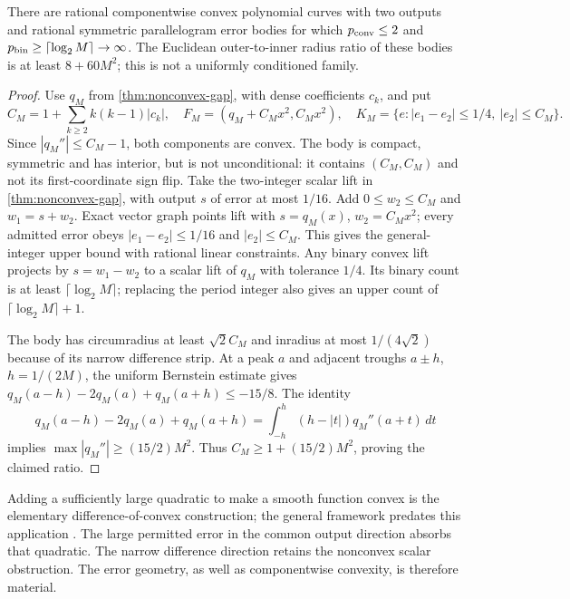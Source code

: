 \begin{proposition}\label{prop:tilted-gap}
There are rational componentwise convex polynomial curves with two outputs
and rational symmetric parallelogram error bodies for which
$p_{\mathrm{conv}}\le2$ and $p_{\mathrm{bin}}\ge\lceil\log_2M\rceil\to\infty$.
The Euclidean outer-to-inner radius ratio of these bodies is at least
$8+60M^2$; this is not a uniformly conditioned family.
\end{proposition}
\begin{proof}
Use $q_M$ from \cref{thm:nonconvex-gap}, with dense coefficients $c_k$,
and put
\[
 C_M=1+\sum_{k\ge2}k(k-1)|c_k|,\quad
 F_M=(q_M+C_Mx^2,C_Mx^2),\quad
 K_M=\{e:|e_1-e_2|\le1/4,\ |e_2|\le C_M\}.
\]
Since $|q_M''|\le C_M-1$, both components are convex. The body is
compact, symmetric and has interior, but is not unconditional: it
contains $(C_M,C_M)$ and not its first-coordinate sign flip.
Take the two-integer scalar lift in \cref{thm:nonconvex-gap}, with
output $s$ of error at most $1/16$. Add $0\le w_2\le C_M$ and
$w_1=s+w_2$. Exact vector graph points lift with
$s=q_M(x)$, $w_2=C_Mx^2$; every admitted error obeys
$|e_1-e_2|\le1/16$ and $|e_2|\le C_M$. This gives the general-integer
upper bound with rational linear constraints.
Any binary convex lift projects by $s=w_1-w_2$ to a scalar lift of
$q_M$ with tolerance $1/4$. Its binary count is at least
$\lceil\log_2M\rceil$; replacing the period integer also gives an
upper count of $\lceil\log_2M\rceil+1$.

The body has circumradius at least $\sqrt2C_M$ and inradius at most
$1/(4\sqrt2)$ because of its narrow difference strip. At a peak $a$
and adjacent troughs $a\pm h$, $h=1/(2M)$, the uniform Bernstein
estimate gives
$q_M(a-h)-2q_M(a)+q_M(a+h)\le-15/8$.
The identity
\[
 q_M(a-h)-2q_M(a)+q_M(a+h)
 =\int_{-h}^h(h-|t|)q_M''(a+t)\,dt
\]
implies $\max|q_M''|\ge(15/2)M^2$. Thus
$C_M\ge1+(15/2)M^2$, proving the claimed ratio.
\end{proof}

Adding a sufficiently large quadratic to make a smooth function convex
is the elementary difference-of-convex construction; the general framework
predates this application \citep{hartman1959}. The large permitted error
in the common output direction absorbs that quadratic. The narrow
difference direction retains the nonconvex scalar obstruction. The error
geometry, as well as componentwise convexity, is therefore material.

